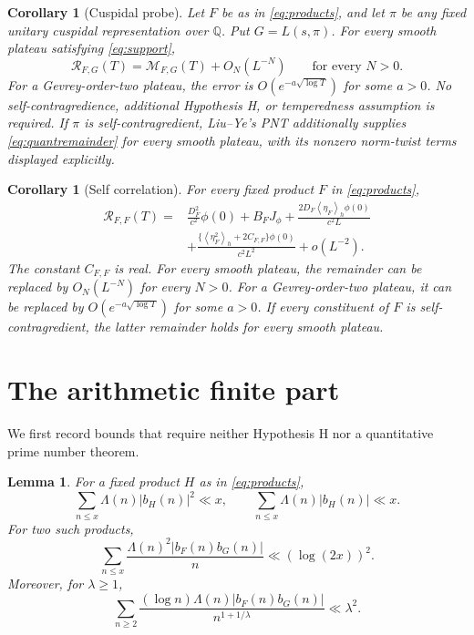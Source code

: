 \documentclass[11pt]{article}
\numberwithin{equation}{section}
\newtheorem{lemma}[theorem]{Lemma}
\newtheorem{corollary}[theorem]{Corollary}
\theoremstyle{remark}
\newcommand{\Q}{\mathbb Q}
\newcommand{\av}[1]{\left\langle #1\right\rangle_h}
\begin{document}
\begin{corollary}[Cuspidal probe]\label{cor:probe}
Let $F$ be as in \eqref{eq:products}, and let $\pi$ be any fixed
unitary cuspidal representation over $\Q$. Put $G=L(s,\pi)$.
For every smooth plateau satisfying \eqref{eq:support},
\[
 \mathcal R_{F,G}(T)=\mathcal M_{F,G}(T)+O_N(L^{-N})
 \qquad\text{for every }N>0.
\]
For a Gevrey-order-two plateau, the error is
$O(e^{-a\sqrt{\log T}})$ for some $a>0$.
No self-contragredience, additional Hypothesis H, or temperedness
assumption is required. If $\pi$ is self-contragredient, Liu--Ye's
PNT additionally supplies \eqref{eq:quantremainder} for every smooth
plateau, with its nonzero norm-twist terms displayed explicitly.
\end{corollary}

\begin{corollary}[Self correlation]\label{cor:self}
For every fixed product $F$ in \eqref{eq:products},
\begin{equation}\label{eq:self}
\begin{split}
 \mathcal R_{F,F}(T)={}&\frac{D_F^2}{c^2}\phi(0)+B_FJ_\phi
 +\frac{2D_F\av{\eta_F}\phi(0)}{c^2L}\\
 &+\frac{\{\av{\eta_F^2}+2C_{F,F}\}\phi(0)}{c^2L^2}
 +o(L^{-2}).
\end{split}
\end{equation}
The constant $C_{F,F}$ is real. For every smooth plateau, the
remainder can be replaced by $O_N(L^{-N})$ for every $N>0$.
For a Gevrey-order-two plateau, it can be replaced by
$O(e^{-a\sqrt{\log T}})$ for some $a>0$. If every constituent of
$F$ is self-contragredient, the latter remainder holds for every
smooth plateau.
\end{corollary}

\section{The arithmetic finite part}

We first record bounds that require neither Hypothesis H nor a
quantitative prime number theorem.

\begin{lemma}\label{lem:bounds}
For a fixed product $H$ as in \eqref{eq:products},
\begin{equation}\label{eq:diagonalbound}
 \sum_{n\leq x}\Lambda(n)|b_H(n)|^2\ll x,\qquad
 \sum_{n\leq x}\Lambda(n)|b_H(n)|\ll x.
\end{equation}
For two such products,
\begin{equation}\label{eq:coeffbound}
 \sum_{n\leq x}\frac{\Lambda(n)^2|b_F(n)b_G(n)|}{n}
       \ll (\log(2x))^2.
\end{equation}
Moreover, for $\lambda\geq1$,
\begin{equation}\label{eq:globalBbound}
 \sum_{n\geq2}\frac{(\log n)\Lambda(n)|b_F(n)b_G(n)|}
                         {n^{1+1/\lambda}}\ll\lambda^2.
\end{equation}
\end{lemma}
\end{document}
